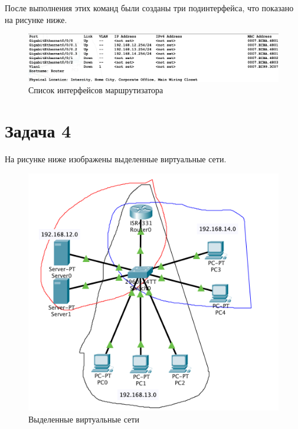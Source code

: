 После выполнения этих команд были созданы три подинтерфейса, что показано на рисунке ниже.

\begin{figure}[H]
    \centering
    \includegraphics[width=1\textwidth]{images/task-3-2.png}
    \caption{Список интерфейсов маршрутизатора}
    \label{fig:router7}
\end{figure}

\section{Задача 4}%
\label{sec:4}

На рисунке ниже изображены выделенные виртуальные сети.

\begin{figure}[H]
    \centering
    \includegraphics[width=1\textwidth]{images/shema.png}
    \caption{Выделенные виртуальные сети}
    \label{fig:router7}
\end{figure}

